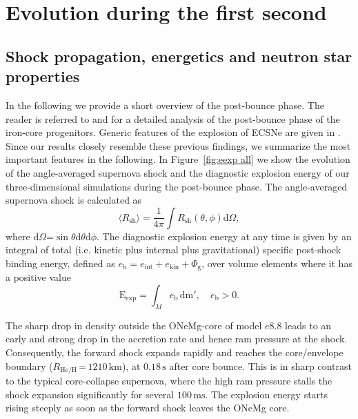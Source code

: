 \documentclass[fleqn,usenatbib]{mnras}
\newcommand{\ud}{\ensuremath{\mathrm{d}}\xspace}
\newcommand{\s}{\ensuremath{\text{s}}}
\newcommand{\GEO}[1]{{\color{red}#1}}
\begin{document}
\section{Evolution during the first second}
\label{sec:Evolution during the first second}
\subsection{Shock propagation, energetics and neutron star properties}
In the following we provide a short overview of the post-bounce phase. The reader is referred to \cite{Melson2015a} and \cite{Melson2019} for a detailed analysis of the post-bounce phase of the iron-core progenitors. Generic features of the explosion of ECSNe are given in \cite{Kitaura2006,Janka2008,Gessner2018}. Since our results closely resemble these previous findings, we \GEO{summarize} the most important features in the following.
In Figure~\ref{fig:eexp all} we show the evolution of the angle-averaged supernova shock and the diagnostic explosion energy of our three-dimensional simulations during the post-bounce phase. 
The angle-averaged supernova shock is calculated as
\begin{equation}
    \langle R_{\mathrm{sh}} \rangle =  \frac{1}{4\pi}\int R_{\mathrm{sh}}(\theta,\phi)\ud \Omega,
    \label{equ:avg rsh}
\end{equation}
where $\ud \Omega\mathord{=}\sin{\theta}\ud\theta\ud\phi$.
The diagnostic explosion energy at any time is given by an integral of total (i.e. kinetic plus internal plus gravitational) specific post-shock binding energy, defined as $e_{\text{b}} = e_{\mathrm{int}} + e_{\mathrm{kin}} + \Phi_{\text{g}}$, over volume elements where it has a positive value 
\begin{equation}
    \mathrm{E}_{\mathrm{exp}} = \int_{M} e_{\mathrm{b}} \, \mathrm{dm'},\quad e_{\mathrm{b}} > 0.
    \label{equ:ene exp}
\end{equation}

The sharp drop in density outside the ONeMg-core of model $e8.8$ leads to an early and strong drop in the accretion rate and hence ram pressure at the shock.
Consequently, the forward shock expands rapidly and reaches the core/envelope boundary ($R_{\mathrm{He/H}}\,\mathord{=}\,1210\,\text{km}$), at $0.18\,\s$ after core bounce.
This is in sharp contrast to the typical core-collapse supernova, where the high ram pressure stalls the shock expansion significantly for several $100\,\text{ms}$. The explosion energy starts rising steeply as soon as the forward shock leaves the ONeMg core.
\end{document}
